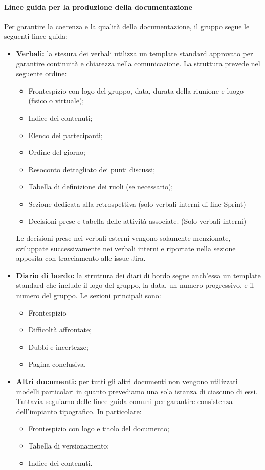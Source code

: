 \documentclass[a4paper,12pt]{article}
\begin{document}
\paragraph{Linee guida per la produzione della documentazione}\label{lineeGuidaProduzioneDocs}
Per garantire la coerenza e la qualità della documentazione, il gruppo segue le
seguenti linee guida:
\begin{itemize}
    \item \textbf{Verbali:} la stesura dei verbali utilizza un template standard approvato per garantire continuità e chiarezza nella comunicazione. La struttura prevede nel seguente ordine:
          \begin{itemize}
              \item Frontespizio con logo del gruppo, data, durata della riunione e luogo (fisico o
                    virtuale);
              \item Indice dei contenuti;
              \item Elenco dei partecipanti;
              \item Ordine del giorno;
              \item Resoconto dettagliato dei punti discussi;
              \item Tabella di definizione dei ruoli (se necessario);
              \item Sezione dedicata alla retrospettiva (solo verbali interni di fine Sprint)
              \item Decisioni prese e tabella delle attività associate. (Solo verbali interni)
          \end{itemize}
    Le decisioni prese nei verbali esterni vengono solamente menzionate, sviluppate successivamente nei verbali interni e riportate nella sezione apposita con tracciamento alle issue Jira.
    \item \textbf{Diario di bordo:} la struttura dei diari di bordo segue anch'essa un template standard che include il logo del gruppo, la data, un numero progressivo, e il numero del gruppo. Le sezioni principali sono:
          \begin{itemize}
              \item Frontespizio
              \item Difficoltà affrontate;
              \item Dubbi e incertezze;
              \item Pagina conclusiva.
          \end{itemize}
    \item \textbf{Altri documenti:} per tutti gli altri documenti non vengono utilizzati modelli particolari in quanto prevediamo una sola istanza di ciascuno di essi. Tuttavia seguiamo delle linee guida comuni per garantire consistenza dell'impianto tipografico. In particolare:
          \begin{itemize}
              \item Frontespizio con logo e titolo del documento;
              \item Tabella di versionamento;
              \item Indice dei contenuti.
          \end{itemize}
\end{itemize}
\end{document}
